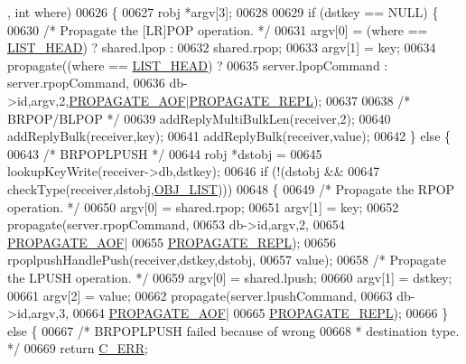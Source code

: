 \begin{DoxyCode}
      , \textcolor{keywordtype}{int} where)
00626 \{
00627     robj *argv[3];
00628 
00629     \textcolor{keywordflow}{if} (dstkey == NULL) \{
00630         \textcolor{comment}{/* Propagate the [LR]POP operation. */}
00631         argv[0] = (where == \hyperlink{server_8h_a5fc6a15ca26c6208f66ad2768a3108ef}{LIST\_HEAD}) ? shared.lpop :
00632                                           shared.rpop;
00633         argv[1] = key;
00634         propagate((where == \hyperlink{server_8h_a5fc6a15ca26c6208f66ad2768a3108ef}{LIST\_HEAD}) ?
00635             server.lpopCommand : server.rpopCommand,
00636             db->id,argv,2,\hyperlink{server_8h_a542fb79924ca427c866fd63632f60777}{PROPAGATE\_AOF}|\hyperlink{server_8h_a59c6e025b4ed85642a0472fc3e73e298}{PROPAGATE\_REPL});
00637 
00638         \textcolor{comment}{/* BRPOP/BLPOP */}
00639         addReplyMultiBulkLen(receiver,2);
00640         addReplyBulk(receiver,key);
00641         addReplyBulk(receiver,value);
00642     \} \textcolor{keywordflow}{else} \{
00643         \textcolor{comment}{/* BRPOPLPUSH */}
00644         robj *dstobj =
00645             lookupKeyWrite(receiver->db,dstkey);
00646         \textcolor{keywordflow}{if} (!(dstobj &&
00647              checkType(receiver,dstobj,\hyperlink{server_8h_a4a5f22a280949c97a0cb0d4213275126}{OBJ\_LIST})))
00648         \{
00649             \textcolor{comment}{/* Propagate the RPOP operation. */}
00650             argv[0] = shared.rpop;
00651             argv[1] = key;
00652             propagate(server.rpopCommand,
00653                 db->id,argv,2,
00654                 \hyperlink{server_8h_a542fb79924ca427c866fd63632f60777}{PROPAGATE\_AOF}|
00655                 \hyperlink{server_8h_a59c6e025b4ed85642a0472fc3e73e298}{PROPAGATE\_REPL});
00656             rpoplpushHandlePush(receiver,dstkey,dstobj,
00657                 value);
00658             \textcolor{comment}{/* Propagate the LPUSH operation. */}
00659             argv[0] = shared.lpush;
00660             argv[1] = dstkey;
00661             argv[2] = value;
00662             propagate(server.lpushCommand,
00663                 db->id,argv,3,
00664                 \hyperlink{server_8h_a542fb79924ca427c866fd63632f60777}{PROPAGATE\_AOF}|
00665                 \hyperlink{server_8h_a59c6e025b4ed85642a0472fc3e73e298}{PROPAGATE\_REPL});
00666         \} \textcolor{keywordflow}{else} \{
00667             \textcolor{comment}{/* BRPOPLPUSH failed because of wrong}
00668 \textcolor{comment}{             * destination type. */}
00669             \textcolor{keywordflow}{return} \hyperlink{server_8h_af98ac28d5f4d23d7ed5985188e6fb7d1}{C\_ERR};

\end{DoxyCode}
